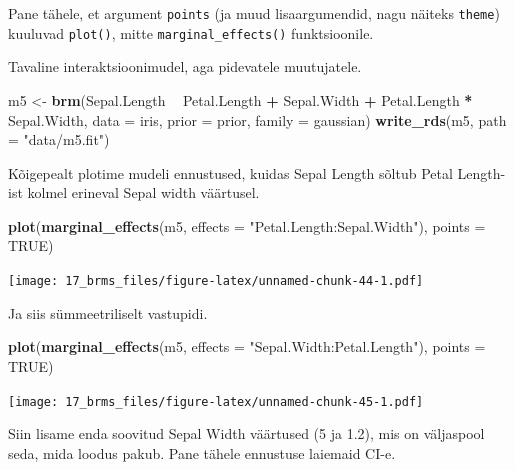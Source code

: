 \documentclass[]{book}
\newenvironment{Shaded}{\begin{snugshade}}{\end{snugshade}}
\newcommand{\KeywordTok}[1]{\textcolor[rgb]{0.13,0.29,0.53}{\textbf{#1}}}
\newcommand{\DataTypeTok}[1]{\textcolor[rgb]{0.13,0.29,0.53}{#1}}
\newcommand{\StringTok}[1]{\textcolor[rgb]{0.31,0.60,0.02}{#1}}
\newcommand{\OtherTok}[1]{\textcolor[rgb]{0.56,0.35,0.01}{#1}}
\newcommand{\OperatorTok}[1]{\textcolor[rgb]{0.81,0.36,0.00}{\textbf{#1}}}
\newcommand{\NormalTok}[1]{#1}
\begin{document}
Pane tähele, et argument \texttt{points} (ja muud lisaargumendid, nagu
näiteks \texttt{theme}) kuuluvad \texttt{plot()}, mitte
\texttt{marginal\_effects()} funktsioonile.

Tavaline interaktsioonimudel, aga pidevatele muutujatele.

\begin{Shaded}
\begin{Highlighting}[]
\NormalTok{m5 <-}\StringTok{ }\KeywordTok{brm}\NormalTok{(Sepal.Length }\OperatorTok{~}\StringTok{ }\NormalTok{Petal.Length }\OperatorTok{+}\StringTok{ }\NormalTok{Sepal.Width }\OperatorTok{+}\StringTok{ }\NormalTok{Petal.Length }\OperatorTok{*}\StringTok{ }\NormalTok{Sepal.Width, }
          \DataTypeTok{data =}\NormalTok{ iris, }
          \DataTypeTok{prior =}\NormalTok{ prior, }
          \DataTypeTok{family =}\NormalTok{ gaussian)}
\KeywordTok{write_rds}\NormalTok{(m5, }\DataTypeTok{path =} \StringTok{"data/m5.fit"}\NormalTok{)}
\end{Highlighting}
\end{Shaded}

Kõigepealt plotime mudeli ennustused, kuidas Sepal Length sõltub Petal
Length-ist kolmel erineval Sepal width väärtusel.

\begin{Shaded}
\begin{Highlighting}[]
\KeywordTok{plot}\NormalTok{(}\KeywordTok{marginal_effects}\NormalTok{(m5, }\DataTypeTok{effects =} \StringTok{"Petal.Length:Sepal.Width"}\NormalTok{), }\DataTypeTok{points =} \OtherTok{TRUE}\NormalTok{)}
\end{Highlighting}
\end{Shaded}

\texttt{[image: 17\_brms\_files/figure-latex/unnamed-chunk-44-1.pdf]}

Ja siis sümmeetriliselt vastupidi.

\begin{Shaded}
\begin{Highlighting}[]
\KeywordTok{plot}\NormalTok{(}\KeywordTok{marginal_effects}\NormalTok{(m5, }\DataTypeTok{effects =} \StringTok{"Sepal.Width:Petal.Length"}\NormalTok{), }\DataTypeTok{points =} \OtherTok{TRUE}\NormalTok{)}
\end{Highlighting}
\end{Shaded}

\texttt{[image: 17\_brms\_files/figure-latex/unnamed-chunk-45-1.pdf]}

Siin lisame enda soovitud Sepal Width väärtused (5 ja 1.2), mis on
väljaspool seda, mida loodus pakub. Pane tähele ennustuse laiemaid CI-e.
\end{document}
